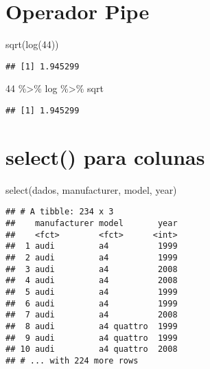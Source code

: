\documentclass[
]{book}
\newenvironment{Shaded}{\begin{snugshade}}{\end{snugshade}}
\newcommand{\DecValTok}[1]{\textcolor[rgb]{0.00,0.00,0.81}{#1}}
\newcommand{\FunctionTok}[1]{\textcolor[rgb]{0.00,0.00,0.00}{#1}}
\newcommand{\NormalTok}[1]{#1}
\newcommand{\SpecialCharTok}[1]{\textcolor[rgb]{0.00,0.00,0.00}{#1}}
\begin{document}
\hypertarget{operador-pipe}{%
\section{Operador Pipe}\label{operador-pipe}}

\begin{Shaded}
\begin{Highlighting}[]
\FunctionTok{sqrt}\NormalTok{(}\FunctionTok{log}\NormalTok{(}\DecValTok{44}\NormalTok{))}
\end{Highlighting}
\end{Shaded}

\begin{verbatim}
## [1] 1.945299
\end{verbatim}

\begin{Shaded}
\begin{Highlighting}[]
\DecValTok{44} \SpecialCharTok{\%\textgreater{}\%}\NormalTok{ log }\SpecialCharTok{\%\textgreater{}\%}\NormalTok{ sqrt}
\end{Highlighting}
\end{Shaded}

\begin{verbatim}
## [1] 1.945299
\end{verbatim}

\hypertarget{select-para-colunas}{%
\section{select() para colunas}\label{select-para-colunas}}

\begin{Shaded}
\begin{Highlighting}[]
\FunctionTok{select}\NormalTok{(dados, manufacturer, model, year)}
\end{Highlighting}
\end{Shaded}

\begin{verbatim}
## # A tibble: 234 x 3
##    manufacturer model       year
##    <fct>        <fct>      <int>
##  1 audi         a4          1999
##  2 audi         a4          1999
##  3 audi         a4          2008
##  4 audi         a4          2008
##  5 audi         a4          1999
##  6 audi         a4          1999
##  7 audi         a4          2008
##  8 audi         a4 quattro  1999
##  9 audi         a4 quattro  1999
## 10 audi         a4 quattro  2008
## # ... with 224 more rows
\end{verbatim}
\end{document}
